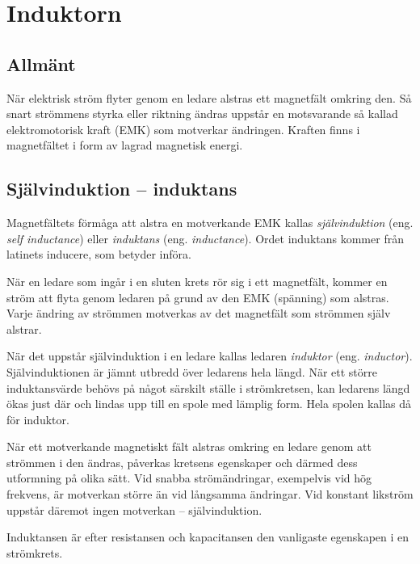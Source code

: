 \section{Induktorn}

\subsection{Allmänt}
\label{induktor_allmänt}

När elektrisk ström flyter genom en ledare alstras ett magnetfält omkring
den. Så snart strömmens styrka eller riktning ändras uppstår en motsvarande
så kallad elektromotorisk kraft (EMK) som motverkar ändringen. Kraften finns i
magnetfältet i form av lagrad magnetisk energi.


\subsection{Självinduktion -- induktans}

Magnetfältets förmåga att alstra en motverkande EMK kallas
\emph{självinduktion} (eng. \emph{self inductance}) eller
\emph{induktans} (eng. \emph{inductance}).
Ordet induktans kommer från latinets inducere, som betyder införa.

När en ledare som ingår i en sluten krets rör sig i ett magnetfält, kommer
en ström att flyta genom ledaren på grund av den EMK (spänning) som alstras.
Varje ändring av strömmen motverkas av det magnetfält som strömmen själv
alstrar.

När det uppstår självinduktion i en ledare kallas ledaren \emph{induktor}
(eng. \emph{inductor}).
Självinduktionen är jämnt utbredd över ledarens hela längd. När ett större
induktansvärde behövs på något särskilt ställe i strömkretsen, kan ledarens
längd ökas just där och lindas upp till en spole med lämplig form.
Hela spolen kallas då för induktor.

När ett motverkande magnetiskt fält alstras omkring en ledare genom att strömmen 
i den ändras, påverkas kretsens egenskaper och därmed dess utformning på olika sätt.
Vid snabba strömändringar, exempelvis vid hög frekvens, är motverkan större än vid
långsamma ändringar.
Vid konstant likström uppstår däremot ingen motverkan -- självinduktion.

Induktansen är efter resistansen och kapacitansen den vanligaste egenskapen i
en strömkrets.

